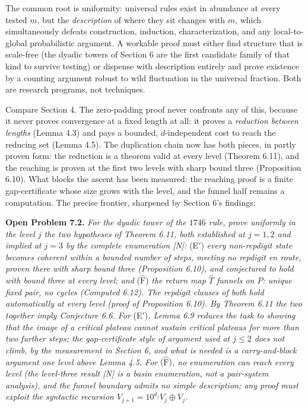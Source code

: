 \documentclass[11pt,letterpaper]{article}
\theoremstyle{paperstyle}
\theoremstyle{paperstyledef}
\theoremstyle{paperstylerem}
\begin{document}
The common root is uniformity: universal rules exist in abundance at every tested \(m\), but the \emph{description} of where they sit changes with \(m\), which simultaneously defeats construction, induction, characterization, and any local-to-global probabilistic argument. A workable proof must either find structure that is scale-free (the dyadic towers of Section 6 are the first candidate family of that kind to survive testing) or dispense with description entirely and prove existence by a counting argument robust to wild fluctuation in the universal fraction. Both are research programs, not techniques.

Compare Section 4. The zero-padding proof never confronts any of this, because it never proves convergence at a fixed length at all: it proves a \emph{reduction between lengths} (Lemma 4.3) and pays a bounded, \(d\)-independent cost to reach the reducing set (Lemma 4.5). The duplication chain now has both pieces, in partly proven form: the reduction is a theorem valid at every level (Theorem 6.11), and the reaching is proven at the first two levels with sharp bound three (Proposition 6.10). What blocks the ascent has been measured: the reaching proof is a finite gap-certificate whose size grows with the level, and the funnel half remains a computation. The precise frontier, sharpened by Section 6's findings:

\textbf{Open Problem 7.2.} \emph{For the dyadic tower of the \(1746\) rule, prove uniformly in the level \(j\) the two hypotheses of Theorem 6.11, both established at \(j = 1, 2\) and implied at \(j = 3\) by the complete enumeration {[}N{]}:} (E\('\)) \emph{every non-repdigit state becomes coherent within a bounded number of steps, meeting no repdigit en route, proven there with sharp bound three (Proposition 6.10), and conjectured to hold with bound three at every level; and} (\(\widehat{\mathrm{F}}\)) \emph{the return map \(\widehat{T}\) funnels on \(P\): unique fixed pair, no cycles (Computed 6.12). The repdigit clauses of both hold automatically at every level (proof of Proposition 6.10). By Theorem 6.11 the two together imply Conjecture 6.6. For} (E\('\))\emph{, Lemma 6.9 reduces the task to showing that the image of a critical plateau cannot sustain critical plateaus for more than two further steps; the gap-certificate style of argument used at \(j \leq 2\) does not climb, by the measurement in Section 6, and what is needed is a carry-and-block argument one level above Lemma 4.5. For} (\(\widehat{\mathrm{F}}\))\emph{, no enumeration can reach every level (the level-three result {[}N{]} is a basin enumeration, not a pair-system analysis), and the funnel boundary admits no simple description; any proof must exploit the syntactic recursion \(V_{j+1} = 10^{d_j} V_j \oplus V_j\).}
\end{document}
